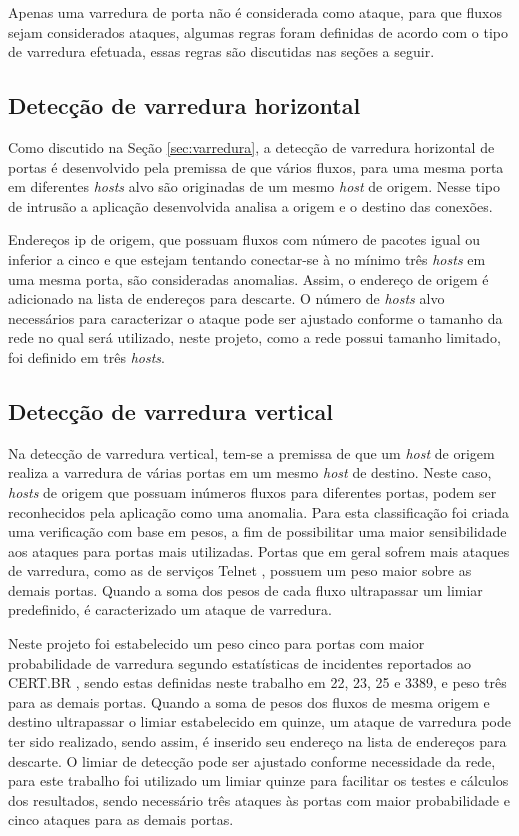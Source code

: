 Apenas uma varredura de porta não é considerada como ataque, para que fluxos sejam considerados ataques, algumas regras foram definidas de acordo com o tipo de varredura efetuada, essas regras são discutidas nas seções a seguir.

\subsection{Detecção de varredura horizontal}

Como discutido na Seção \ref{sec:varredura}, a detecção de varredura horizontal de portas é desenvolvido pela premissa de que vários fluxos, para uma mesma porta em diferentes \textit{hosts} alvo são originadas de um mesmo \textit{host} de origem. Nesse tipo de intrusão a aplicação desenvolvida analisa a origem e o destino das conexões. 

Endereços \gls{ip} de origem, que possuam fluxos com número de pacotes igual ou inferior a cinco e que estejam tentando conectar-se à no mínimo três \textit{hosts} em uma mesma porta, são consideradas anomalias. Assim, o endereço de origem é adicionado na lista de endereços para descarte.
O número de \textit{hosts} alvo necessários para caracterizar o ataque pode ser ajustado conforme o tamanho da rede no qual será utilizado, neste projeto, como a rede possui tamanho limitado, foi definido em três \textit{hosts}.

\subsection{Detecção de varredura vertical}

Na detecção de varredura vertical, tem-se a premissa de que um \textit{host} de origem realiza a varredura de várias portas em um mesmo \textit{host} de destino. Neste caso, \textit{hosts} de origem que possuam inúmeros fluxos para diferentes portas, podem ser reconhecidos pela aplicação como uma anomalia. Para esta classificação foi criada uma verificação com base em pesos, a fim de possibilitar uma maior sensibilidade aos ataques para portas mais utilizadas. Portas que em geral sofrem mais ataques de  varredura, como as de serviços Telnet \cite{rfc854}, possuem um peso maior sobre as demais portas. Quando a soma dos pesos de cada fluxo ultrapassar um limiar predefinido, é caracterizado um ataque de varredura. 

Neste projeto foi estabelecido um peso cinco para portas com maior probabilidade de varredura segundo estatísticas de incidentes reportados ao CERT.BR \cite{certbr}, sendo estas definidas neste trabalho em 22, 23, 25 e 3389, e peso três para as demais portas. Quando a soma de pesos dos fluxos de mesma origem e destino ultrapassar o limiar estabelecido em quinze, um ataque de varredura pode ter sido realizado, sendo assim, é inserido seu endereço na lista de endereços para descarte. O limiar de detecção pode ser ajustado conforme necessidade da rede, para este trabalho foi utilizado um limiar quinze para facilitar os testes e cálculos dos resultados, sendo necessário três ataques às portas com maior probabilidade e cinco ataques para as demais portas.

